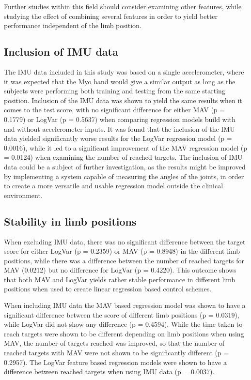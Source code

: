 	Further studies within this field should consider examining other features, while studying the effect of combining several features in order to yield better performance independent of the limb position.
	
	\subsection{Inclusion of IMU data}
	The IMU data included in this study was based on a single accelerometer, where it was expected that the Myo band would give a similar output as long as the subjects were performing both training and testing from the same starting position. Inclusion of the IMU data was shown to yield the same results when it comes to the test score, with no significant difference for either MAV (p = 0.1779) or LogVar (p = 0.5637) when comparing regression models build with and without accelerometer inputs. It was found that the inclusion of the IMU data yielded significantly worse results for the LogVar regression model (p = 0.0016), while it led to a significant improvement of the MAV regression model (p = 0.0124) when examining the number of reached targets. The inclusion of IMU data could be a subject of further investigation, as the results might be improved by implementing a system capable of measuring the angles of the joints, in order to create a more versatile and usable regression model outside the clinical environment.  
	
	\subsection{Stability in limb positions}
	When excluding IMU data, there was no significant difference between the target score for either LogVar (p = 0.2359) or MAV (p = 0.8948) in the different limb positions, while there was a difference between the number of reached targets for MAV (0.0212) but no difference for LogVar (p = 0.4220). This outcome shows that both MAV and LogVar yields rather stable performance in different limb positions when used to create linear regression based control schemes.
	
	When including IMU data the MAV based regression model was shown to have a significant difference between the score of different limb positions (p = 0.0319), while LogVar did not show any difference (p = 0.4594). While the time taken to reach targets were shown to be different depending on limb positions when using MAV, the number of targets reached was improved, so that the number of reached targets with MAV were not shown to be significantly different (p = 0.2957). The LogVar feature based regression models were shown to have a difference between reached targets when using IMU data (p = 0.0037).
	
